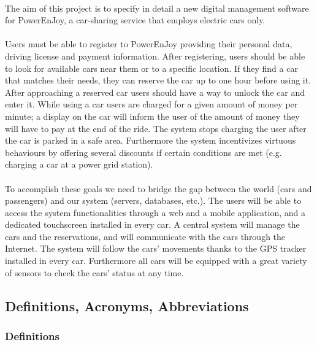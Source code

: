 \documentclass[english]{article}
\begin{document}
\paragraph{}
The aim of this project is to specify in detail a new digital management software for PowerEnJoy, a car-sharing service that employs electric cars only.

\paragraph{}
Users must be able to register to PowerEnJoy providing their personal data, driving license and payment information.
After registering, users should be able to look for available cars near them or to a specific location. If they find a car that matches their needs, they can reserve the car up to one hour before using it. After approaching a reserved car users should have a way to unlock the car and enter it.
While using a car users are charged for a given amount of money per minute; a display on the car will inform the user of the amount of money they will have to pay at the end of the ride.
The system stops charging the user after the car is parked in a safe area.
Furthermore the system incentivizes virtuous behaviours by offering several discounts if certain conditions are met (e.g. charging a car at a power grid station).

\paragraph{}
To accomplish these goals we need to bridge the gap between the world (cars and passengers) and our system (servers, databases, etc.).
The users will be able to access the system functionalities through a web and a mobile application, and a dedicated touchscreen installed in every car.
A central system will manage the cars and the reservations, and will communicate with the cars through the Internet. The system will follow the cars’ movements thanks to the GPS tracker installed in every car. Furthermore all cars will be equipped with a great variety of sensors to check the cars’ status at any time.

\newpage
\subsection{Definitions, Acronyms, Abbreviations}

\subsubsection{Definitions}
\end{document}
